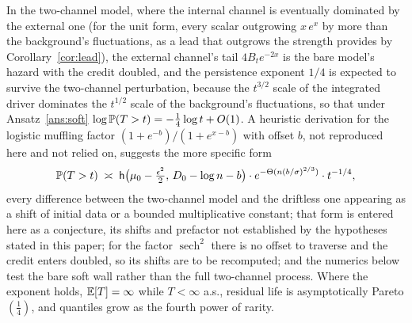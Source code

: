 \begin{proposition}\label{thm:transfer}
In the two-channel model, where the internal channel is eventually dominated by the external one (for the unit form, every scalar outgrowing $x\,e^{x}$ by more than the background's fluctuations, as a lead that outgrows the strength provides by Corollary~\ref{cor:lead}), the external channel's tail $4B_te^{-2x}$ is the bare model's hazard with the credit doubled, and the persistence exponent
$1/4$ is expected to survive the two-channel perturbation, because
the $t^{3/2}$ scale of the integrated driver dominates the $t^{1/2}$
scale of the background's fluctuations, so that under
Ansatz~\ref{ans:soft} $\log\mathbb{P}(T>t)=-\tfrac14\log t+O(1)$. A heuristic derivation for the logistic muffling factor $(1+e^{-b})/(1+e^{x-b})$ with offset $b$, not reproduced here and not relied on, suggests
the more specific form
\begin{equation}\label{eq:transfer}
\mathbb{P}(T>t)\;\asymp\;
\mathsf{h}\bigl(\mu_0-\tfrac{\epsilon^2}{2},\,D_0-\log n-b\bigr)\cdot
e^{-\Theta(n(b/\sigma)^{2/3})}\cdot t^{-1/4},
\end{equation}
every difference between the two-channel model and the driftless one
appearing as a shift of initial data or a bounded multiplicative
constant; that form is entered here as a conjecture, its shifts and
prefactor not established by the hypotheses stated in this paper; for the factor $\operatorname{sech}^2$ there is no offset to traverse and the credit enters doubled, so its shifts are to be recomputed; and
the numerics below test the bare soft wall rather than the full
two-channel process. Where the exponent holds, $\mathbb{E}[T]=\infty$ while
$T<\infty$ a.s., residual life is asymptotically Pareto$(\tfrac14)$,
and quantiles grow as the fourth power of rarity.
\end{proposition}

